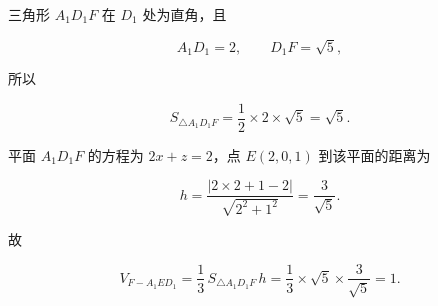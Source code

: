 \begin{answer}

三角形 $A_1D_1F$ 在 $D_1$ 处为直角，且

\nopagebreak[4]
\[
A_1D_1=2,\qquad D_1F=\sqrt5,
\]

所以

\nopagebreak[4]
\[
S_{\triangle A_1D_1F}=\frac12\times2\times\sqrt5=\sqrt5.
\]

平面 $A_1D_1F$ 的方程为 $2x+z=2$，点 $E(2,0,1)$ 到该平面的距离为

\nopagebreak[4]
\[
h=\frac{|2\times2+1-2|}{\sqrt{2^2+1^2}}=\frac3{\sqrt5}.
\]

故

\nopagebreak[4]
\[
V_{F-A_1ED_1}
=\frac13\,S_{\triangle A_1D_1F}\,h
=\frac13\times\sqrt5\times\frac3{\sqrt5}=1.
\]





\end{answer}
